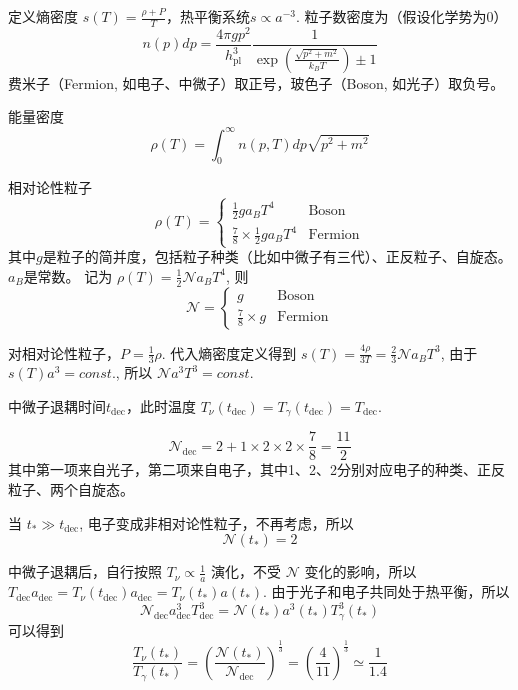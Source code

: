 \documentclass[12pt]{ctexart}
\begin{document}
定义熵密度 $s(T) = \frac{\rho+P}{T}$，热平衡系统$s\propto a^{-3}$.
粒子数密度为（假设化学势为0）
\begin{equation}
    n(p) dp = \frac{4\pi g p^2}{h_{\mathrm{pl}}^3} \frac{1}{\exp\left(\frac{\sqrt{p^2+m^2}}{k_B T}\right) \pm 1}
\end{equation}
费米子（Fermion, 如电子、中微子）取正号，玻色子（Boson, 如光子）取负号。

能量密度
\begin{equation}
    \rho (T) = \int_0^\infty n(p,T) dp \sqrt{p^2+m^2}
\end{equation}

相对论性粒子
\begin{equation}
    \rho(T) =
    \begin{cases}
        \frac{1}{2} g a_B T^4   & \text{Boson} \\ 
        \frac{7}{8} \times \frac{1}{2} g a_B T^4 & \text{Fermion}
    \end{cases}
\end{equation}
其中$g$是粒子的简并度，包括粒子种类（比如中微子有三代）、正反粒子、自旋态。$a_B$是常数。
记为 $\rho(T) = \frac{1}{2} \mathcal{N} a_B T^4 $, 则
\begin{equation}
    \mathcal{N} =
    \begin{cases}
        g  & \text{Boson} \\ 
        \frac{7}{8} \times g  & \text{Fermion}
    \end{cases}
\end{equation}

对相对论性粒子，$P=\frac{1}{3}\rho$.
代入熵密度定义得到
$s(T) = \frac{4\rho}{3T} = \frac{2}{3} \mathcal{N} a_B T^3$,
由于$s(T) a^3 = const.$,
所以 
$\mathcal{N} a^3 T^3 = const.$

中微子退耦时间$t_\text{dec}$，此时温度 $T_\nu(t_\text{dec}) = T_\gamma(t_\text{dec}) = T_\text{dec}$.

\begin{equation}
    \mathcal{N}_\text{dec} = 2+ 1\times 2\times 2\times \frac{7}{8} = \frac{11}{2}
\end{equation}
其中第一项来自光子，第二项来自电子，其中1、2、2分别对应电子的种类、正反粒子、两个自旋态。

当 $t_* \gg t_\text{dec}$, 电子变成非相对论性粒子，不再考虑，所以
\begin{equation}
    \mathcal{N}(t_*) = 2
\end{equation}

中微子退耦后，自行按照 $T_\nu \propto \frac{1}{a}$ 演化，不受 $\mathcal{N}$ 变化的影响，所以
$T_\text{dec} a_\text{dec} = T_\nu (t_\text{dec}) a_\text{dec} = T_\nu(t_*) a(t_*)$.
由于光子和电子共同处于热平衡，所以 
\begin{equation}
    \mathcal{N}_\text{dec} a_\text{dec}^3 T_\text{dec}^3 = \mathcal{N}(t_*) a^3(t_*) T_\gamma^3(t_*)
\end{equation}
可以得到
\begin{equation}
    \frac{T_\nu(t_*)}{T_\gamma(t_*)} = \left(\frac{\mathcal{N}(t_*)}{\mathcal{N}_\text{dec}}\right)^\frac{1}{3} = \left(\frac{4}{11}\right)^\frac{1}{3} \simeq \frac{1}{1.4} 
\end{equation}
\end{document}
